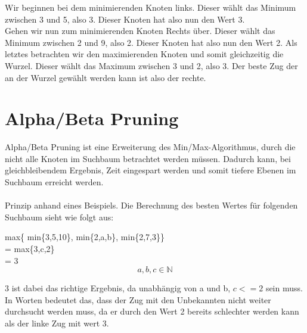 Wir beginnen bei dem minimierenden Knoten links.
Dieser w\"ahlt das Minimum zwischen 3 und 5, also 3.
Dieser Knoten hat also nun den Wert 3.\\
Gehen wir nun zum minimierenden Knoten Rechts \"uber.
Dieser w\"ahlt das Minimum zwischen 2 und 9, also 2.
Dieser Knoten hat also nun den Wert 2.
Als letztes betrachten wir den maximierenden Knoten und somit gleichzeitig die Wurzel.
Dieser w\"ahlt das Maximum zwischen 3 und 2, also 3.
Der beste Zug der an der Wurzel gew\"ahlt werden kann ist also der rechte.

\section{Alpha/Beta Pruning}
Alpha/Beta Pruning ist eine Erweiterung des Min/Max-Algorithmus, durch die nicht alle Knoten im Suchbaum betrachtet werden m\"ussen.
Dadurch kann, bei gleichbleibendem Ergebnis, Zeit eingespart werden und somit tiefere Ebenen im Suchbaum erreicht werden.
\\\\
Prinzip anhand eines Beispiels.
Die Berechnung des besten Wertes f\"ur folgenden Suchbaum sieht wie folgt aus:
\begin{flushleft}
max\{ min\{3,5,10\}, min\{2,a,b\}, min\{2,7,3\}\}\\ = max\{3,c,2\}\\ = 3      $$a,b,c \in \mathbb{N}$$
\end{flushleft}
3 ist dabei das richtige Ergebnis, da unabh\"angig von a und b, $c<=2$ sein muss.
In Worten bedeutet das, dass der Zug mit den Unbekannten nicht weiter durchsucht werden muss, da er durch den Wert 2 bereits schlechter werden kann als der linke Zug mit wert 3.

